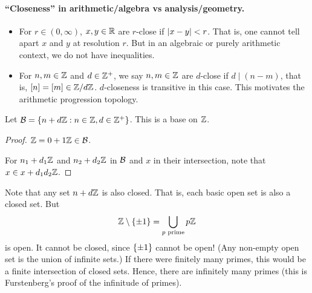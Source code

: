 \paragraph{``Closeness'' in arithmetic/algebra vs analysis/geometry.}
\begin{itemize}
    \item For $r \in (0, \infty)$, $x, y \in \mathbb{R}$ are $r$-close if
    $\lvert x - y\rvert < r$.
    That is, one cannot tell apart $x$ and $y$ at resolution $r$.
    But in an algebraic or purely arithmetic context,
    we do not have inequalities.
    \item For $n, m \in \mathbb{Z}$ and $d \in \mathbb{Z}^+$, we say $n, m \in \mathbb{Z}$ are
    $d$-close if $d \mid (n - m)$, that is, $[n] = [m] \in \mathbb{Z}/d\mathbb{Z}$.
    $d$-closeness is transitive in this case.
    This motivates the arithmetic progression topology.
\end{itemize}
\begin{proposition} \label{thm:ap-topo}
    Let $\mathcal{B} = \{n + d \mathbb{Z} : n \in \mathbb{Z}, d \in \mathbb{Z}^+\}$.
    This is a base on $\mathbb{Z}$.
\end{proposition}
\begin{proof}
    $\mathbb{Z} = 0 + 1 \mathbb{Z} \in \mathcal{B}$.

    For $n_1 + d_1 \mathbb{Z}$ and $n_2 + d_2 \mathbb{Z}$ in $\mathcal{B}$ and $x$ in their
    intersection, note that $x \in x + d_1 d_2 \mathbb{Z}$.
\end{proof}
Note that any set $n + d \mathbb{Z}$ is also closed.
That is, each basic open set is also a closed set.
But \[
    \mathbb{Z} \setminus \{\pm 1\} = \bigcup_{p \text{ prime}} p \mathbb{Z}
\] is open.
It cannot be closed, since $\{\pm 1\}$ cannot be open!
(Any non-empty open set is the union of infinite sets.)
If there were finitely many primes, this would be a finite intersection of
closed sets.
Hence, there are infinitely many primes (this is Furstenberg's proof of
the infinitude of primes).
